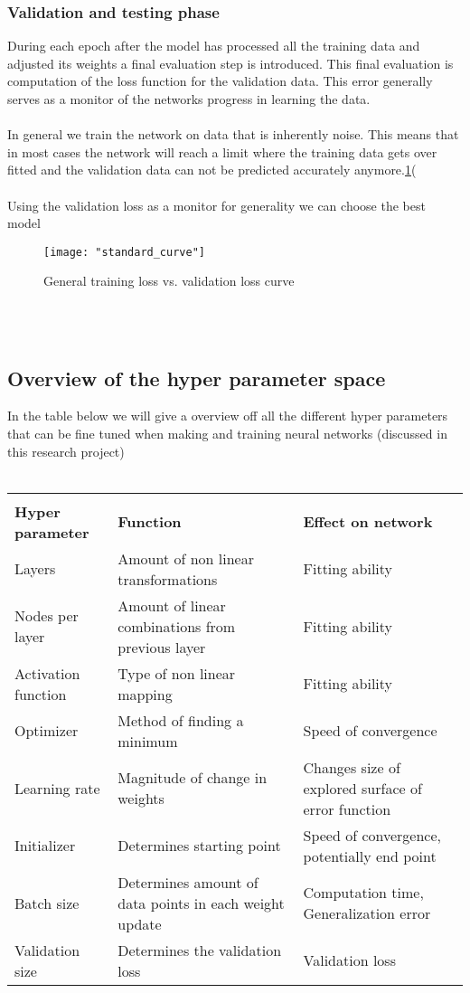 \documentclass[12pt]{article}
\begin{document}
\subsubsection{Validation and testing phase}
During each epoch after the model has processed all the training data and adjusted its weights a final evaluation step is introduced. This final evaluation is computation of the loss function for the validation data. This error generally serves as a monitor of the networks progress in learning the data.
\\
\\
In general we train the network on data that is inherently noise. This means that in most cases the network will reach a limit where the training data gets over fitted and the validation data can not be predicted accurately anymore.\ref{fig:curve}(\cite{Bishop2013}\cite{Haykin2008}\cite{Budumu}\cite{P.Murphy1991}\cite{TrevorHastie2009}
\\
\\
Using the validation loss as a monitor for generality we can choose the best model 
\begin{figure}[h]
	\centering
	\texttt{[image: "standard\_curve"]}
	\caption{General training loss vs. validation loss curve}
	\label{fig:curve}
\end{figure}
\newpage
\\
\\
\cleardoublepage
\newpage
\subsection{Overview of the hyper parameter space}
In the table below we will give a overview off all the different hyper parameters that can be fine tuned when making and training neural networks (discussed in this research project)
\\
\\
\begin{tabularx}{\textwidth}{|X|X|X|}
	\hline \\
	\textbf{Hyper parameter} & \textbf{Function} & \textbf{Effect on network} \\
	\hline
	Layers & Amount of non linear transformations & Fitting ability \\
	Nodes per layer & Amount of linear combinations from previous layer & Fitting ability \\
	Activation function & Type of non linear mapping & Fitting ability \\
	Optimizer & Method of finding a minimum & Speed of convergence \\
	Learning rate & Magnitude of change in weights & Changes size of explored surface of error function \\
	Initializer & Determines starting point & Speed of convergence, potentially end point \\
	Batch size & Determines amount of data points in each weight update & Computation time, Generalization error \\
	Validation size & Determines the validation loss & Validation loss \\
	\hline
\end{tabularx}	
\newpage
\end{document}
